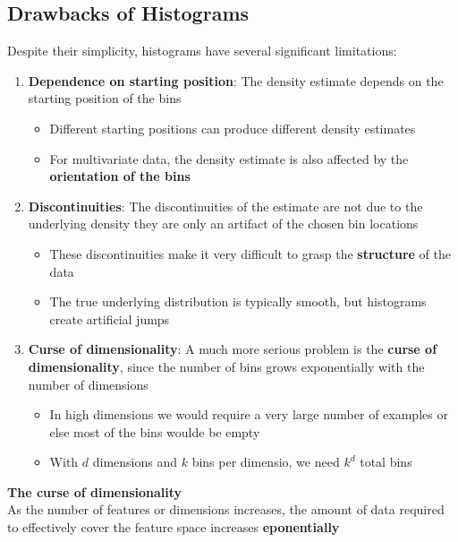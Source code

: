 \documentclass[a4paper]{article}
\theoremstyle{definition}
\begin{document}
\subsection{Drawbacks of Histograms}
Despite their simplicity, histograms have several significant limitations:
\begin{enumerate}
    \item \textbf{Dependence on starting position}: The density estimate depends on the starting position of the bins
    \begin{itemize}
        \item Different starting positions can produce different density estimates
        \item For multivariate data, the density estimate is also affected by the \textbf{orientation of the bins}
    \end{itemize}
    \item \textbf{Discontinuities}: The discontinuities of the estimate are not due to the underlying density they are only an artifact of the chosen bin locations 
    \begin{itemize}
        \item These discontinuities make it very difficult to grasp the \textbf{structure} of the data 
        \item The true underlying distribution is typically smooth, but histograms create artificial jumps
    \end{itemize}
    \item \textbf{Curse of dimensionality}: A much more serious problem is the \textbf{curse of dimensionality}, since the number of bins grows exponentially with the number of dimensions
    \begin{itemize}
        \item In high dimensions we would require a very large number of examples or else most of the bins woulde be empty
        \item With \( d \) dimensions and \( k \) bins per dimensio, we need \( k^d \) total bins
    \end{itemize}
\end{enumerate}
\begin{tcolorbox}[
    colback=magenta!15!white,
    colframe=magenta!15!white,
    boxrule=0pt,
    arc=0pt,
    halign=center
]
    \textbf{The curse of dimensionality}\\[0.5em]
    As the number of features or dimensions increases, the amount of data required to effectively cover the feature space increases \textbf{eponentially}
\end{tcolorbox}
\end{document}
